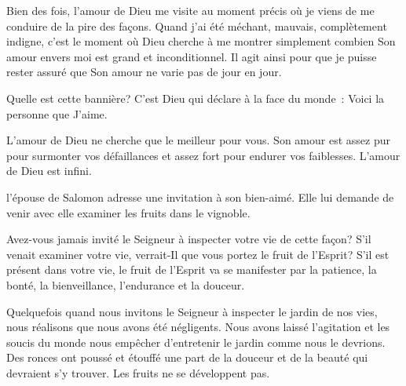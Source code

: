 Bien des fois, l'amour de Dieu me visite au moment précis
 où je viens de me conduire de la pire des façons.
 Quand j'ai été méchant, mauvais, complètement indigne,
 c'est le moment où Dieu cherche à me montrer simplement
 combien Son amour envers moi est grand et inconditionnel.
 Il agit ainsi pour que je puisse rester assuré que Son amour
 ne varie pas de jour en jour. 

Quelle est cette bannière?
 C'est Dieu qui déclare à la face du monde~: 
 \og Voici la personne que J'aime. \fg{}



L'amour de Dieu ne cherche que le meilleur pour vous.
 Son amour est assez pur pour surmonter vos défaillances
 et assez fort pour endurer vos faiblesses.
 L'amour de Dieu est infini. 

\dvrule






 l'épouse de Salomon adresse une invitation à son bien-aimé.
 Elle lui demande de venir avec elle examiner les fruits dans le vignoble.

Avez-vous jamais invité le Seigneur à inspecter votre vie de cette façon?
 S'il venait examiner votre vie, verrait-Il que vous portez
 le fruit de l'Esprit? S'il est présent dans votre vie,
 le fruit de l'Esprit va se manifester par la patience, la bonté,
 la bienveillance, l'endurance et la douceur.


Quelquefois quand nous invitons le Seigneur à inspecter le jardin de nos vies,
 nous réalisons que nous avons été négligents.
 Nous avons laissé l'agitation et les soucis du monde nous empêcher
 d'entretenir le jardin comme nous le devrions.
 Des ronces ont poussé et étouffé une part de la douceur et de la beauté
 qui devraient s'y trouver. Les fruits ne se développent pas.

